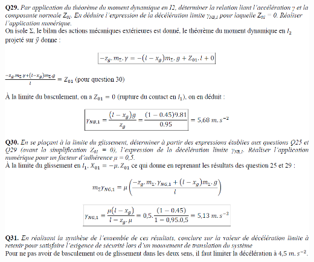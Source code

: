 \documentclass[10pt,fleqn]{article} %
\begin{document}
\begin{center}
\includegraphics[width=.8\linewidth]{images/cor_02}
\end{center}
\end{document}

